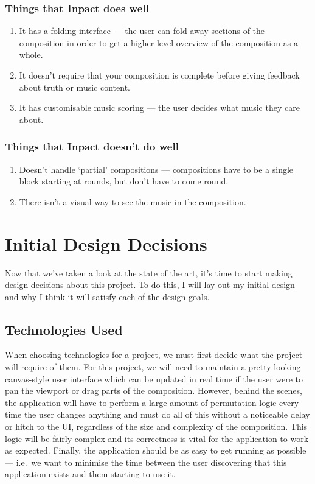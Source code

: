 \documentclass[12pt]{article}
\begin{document}
\subsubsection{Things that Inpact does well}

\begin{enumerate}
    \item It has a folding interface --- the user can fold away sections of the composition in order
        to get a higher-level overview of the composition as a whole.
    \item It doesn't require that your composition is complete before giving feedback about truth or
        music content.
    \item It has customisable music scoring --- the user decides what music they care about.
\end{enumerate}

\subsubsection{Things that Inpact doesn't do well}

\begin{enumerate}
    \item Doesn't handle `partial' compositions --- compositions have to be a single block starting
        at rounds, but don't have to come round.
    \item There isn't a visual way to see the music in the composition.
\end{enumerate}



\pagebreak

\section{Initial Design Decisions}

Now that we've taken a look at the state of the art, it's time to start making design decisions
about this project.  To do this, I will lay out my initial design and why I think it will satisfy
each of the design goals.

\subsection{Technologies Used}

When choosing technologies for a project, we must first decide what the project will require of
them.  For this project, we will need to maintain a pretty-looking canvas-style user interface which
can be updated in real time if the user were to pan the viewport or drag parts of the composition.
However, behind the scenes, the application will have to perform a large amount of permutation logic
every time the user changes anything and must do all of this without a noticeable delay or hitch to
the UI, regardless of the size and complexity of the composition.  This logic will be fairly complex
and its correctness is vital for the application to work as expected.  Finally, the application
should be as easy to get running as possible --- i.e.\ we want to minimise the time between the user
discovering that this application exists and them starting to use it.
\end{document}
